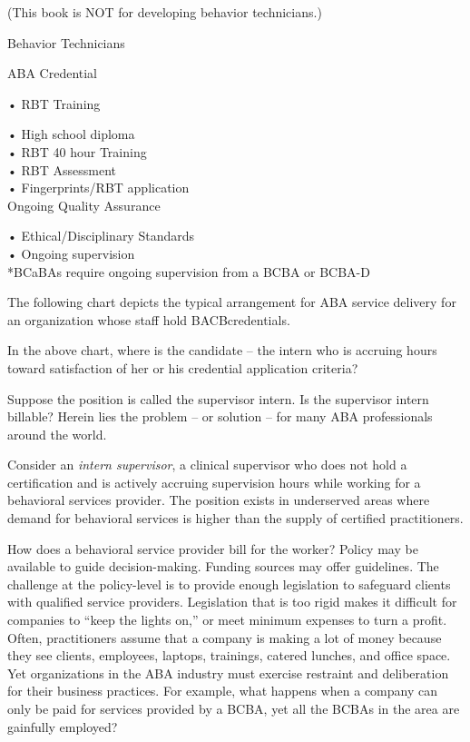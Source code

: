 (This book is NOT for developing behavior technicians.)

Behavior Technicians 


ABA Credential

    • RBT 
%
%
%
Training

    • High school diploma\\
    • RBT 40 hour Training\\
    • RBT Assessment\\
    • Fingerprints/RBT application\\


Ongoing Quality Assurance

    • Ethical/Disciplinary Standards\\
    • Ongoing supervision\\

*BCaBAs require ongoing supervision from a BCBA or BCBA-D

The following chart depicts the typical arrangement for ABA service delivery for an organization whose staff hold BACB\textregistered credentials.


In the above chart, where is the candidate – the intern who is accruing hours toward satisfaction of her or his credential application criteria? 

Suppose the position is called the supervisor intern. Is the supervisor intern billable? Herein lies the problem – or solution – for many ABA professionals around the world.

Consider an \textit{intern supervisor}, a clinical supervisor who does not hold a certification and is actively accruing supervision hours while working for a behavioral services provider. The position exists in underserved areas where demand for behavioral services is higher than the supply of certified practitioners. 

How does a behavioral service provider bill for the worker? Policy may be available to guide decision-making. Funding sources may offer guidelines. The challenge at the policy-level is to provide enough legislation to safeguard clients with qualified service providers. Legislation that is too rigid makes it difficult for companies to ``keep the lights on,'' or meet minimum expenses to turn a profit. Often, practitioners assume that a company is making a lot of money because they see clients, employees, laptops, trainings, catered lunches, and office space. Yet organizations in the ABA industry must exercise restraint and deliberation for their business practices. For example, what happens when a company can only be paid for services provided by a BCBA, yet all the BCBAs in the area are gainfully employed? 

